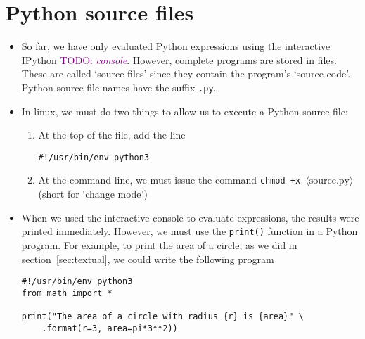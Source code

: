 \documentclass[a4paper,twoside]{memoir}
\newcommand{\shellcmd}{\texttt}
\newcommand{\shellvar}[1]{$\langle \text{#1}\rangle$}
\newcommand{\TODO}[1]{\textcolor{purple}{TODO: \emph{#1}}}
\begin{document}
\section{Python source files}
\begin{itemize}
\item So far, we have only evaluated Python expressions using the interactive IPython \TODO{console}.  However, complete programs are stored in files.  These are called `source files' since they contain the program's `source code'.  Python source file names have the suffix \shellcmd{.py}.
\item In linux, we must do two things to allow us to execute a Python source file:
\begin{enumerate}
	\item At the top of the file, add the line
\begin{verbatim}
#!/usr/bin/env python3
\end{verbatim}
	\item At the command line, we must issue the command \shellcmd{chmod +x \shellvar{source.py}} (short for `change mode')
\end{enumerate}
\item When we used the interactive console to evaluate expressions, the results were printed immediately.  However, we must use the \shellcmd{print()} function in a Python program.  For example, to print the area of a circle, as we did in section~\ref{sec:textual}, we could write the following program
\begin{verbatim}
#!/usr/bin/env python3
from math import *

print("The area of a circle with radius {r} is {area}" \
	.format(r=3, area=pi*3**2))
\end{verbatim}

\end{itemize}

\end{document}

